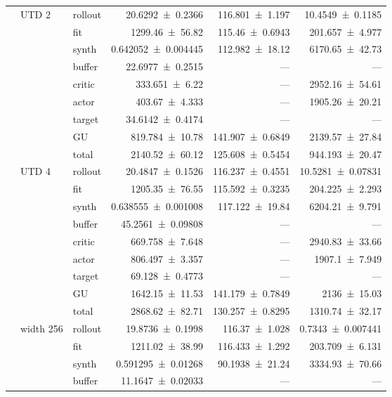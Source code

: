{\begin{longtable}{@{}lllrrr@{}}
    \addlinespace[2pt]
     & UTD 2 & rollout & \num{20.6292+-0.2366} & \num{116.801+-1.197} & \num{10.4549+-0.1185} \\
     &  & fit & \num{1299.46+-56.82} & \num{115.46+-0.6943} & \num{201.657+-4.977} \\
     &  & synth & \num{0.642052+-0.004445} & \num{112.982+-18.12} & \num{6170.65+-42.73} \\
     &  & buffer & \num{22.6977+-0.2515} & --- & --- \\
     &  & critic & \num{333.651+-6.22} & --- & \num{2952.16+-54.61} \\
     &  & actor & \num{403.67+-4.333} & --- & \num{1905.26+-20.21} \\
     &  & target & \num{34.6142+-0.4174} & --- & --- \\
     &  & GU & \num{819.784+-10.78} & \num{141.907+-0.6849} & \num{2139.57+-27.84} \\
     &  & total & \num{2140.52+-60.12} & \num{125.608+-0.5454} & \num{944.193+-20.47} \\
    \addlinespace[2pt]
     & UTD 4 & rollout & \num{20.4847+-0.1526} & \num{116.237+-0.4551} & \num{10.5281+-0.07831} \\
     &  & fit & \num{1205.35+-76.55} & \num{115.592+-0.3235} & \num{204.225+-2.293} \\
     &  & synth & \num{0.638555+-0.001008} & \num{117.122+-19.84} & \num{6204.21+-9.791} \\
     &  & buffer & \num{45.2561+-0.09808} & --- & --- \\
     &  & critic & \num{669.758+-7.648} & --- & \num{2940.83+-33.66} \\
     &  & actor & \num{806.497+-3.357} & --- & \num{1907.1+-7.949} \\
     &  & target & \num{69.128+-0.4773} & --- & --- \\
     &  & GU & \num{1642.15+-11.53} & \num{141.179+-0.7849} & \num{2136+-15.03} \\
     &  & total & \num{2868.62+-82.71} & \num{130.257+-0.8295} & \num{1310.74+-32.17} \\
    \addlinespace[2pt]
     & width 256 & rollout & \num{19.8736+-0.1998} & \num{116.37+-1.028} & \num{0.7343+-0.007441} \\
     &  & fit & \num{1211.02+-38.99} & \num{116.433+-1.292} & \num{203.709+-6.131} \\
     &  & synth & \num{0.591295+-0.01268} & \num{90.1938+-21.24} & \num{3334.93+-70.66} \\
     &  & buffer & \num{11.1647+-0.02033} & --- & --- \\

\end{longtable}}
